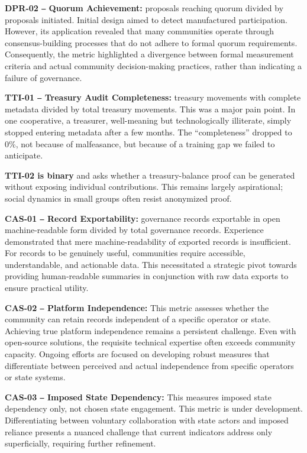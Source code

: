 \documentclass[sigconf,anonymous]{acmart}
\begin{document}
\textbf{DPR-02 ‒ Quorum Achievement:} proposals reaching quorum divided by proposals initiated. Initial design aimed to detect manufactured participation. However, its application revealed that many communities operate through consensus-building processes that do not adhere to formal quorum requirements. Consequently, the metric highlighted a divergence between formal measurement criteria and actual community decision-making practices, rather than indicating a failure of governance.

\textbf{TTI-01 ‒ Treasury Audit Completeness:} treasury movements with complete metadata divided by total treasury movements. This was a major pain point. In one cooperative, a treasurer, well-meaning but technologically illiterate, simply stopped entering metadata after a few months. The “completeness” dropped to 0\%, not because of malfeasance, but because of a training gap we failed to anticipate.

\textbf{TTI-02 is binary} and asks whether a treasury-balance proof can be generated without exposing individual contributions. This remains largely aspirational; social dynamics in small groups often resist anonymized proof.

\textbf{CAS-01 ‒ Record Exportability:} governance records exportable in open machine-readable form divided by total governance records. Experience demonstrated that mere machine-readability of exported records is insufficient. For records to be genuinely useful, communities require accessible, understandable, and actionable data. This necessitated a strategic pivot towards providing human-readable summaries in conjunction with raw data exports to ensure practical utility.

\textbf{CAS-02 ‒ Platform Independence:} This metric assesses whether the community can retain records independent of a specific operator or state. Achieving true platform independence remains a persistent challenge. Even with open-source solutions, the requisite technical expertise often exceeds community capacity. Ongoing efforts are focused on developing robust measures that differentiate between perceived and actual independence from specific operators or state systems.

\textbf{CAS-03 ‒ Imposed State Dependency:} This measures imposed state dependency only, not chosen state engagement. This metric is under development. Differentiating between voluntary collaboration with state actors and imposed reliance presents a nuanced challenge that current indicators address only superficially, requiring further refinement.
\end{document}
